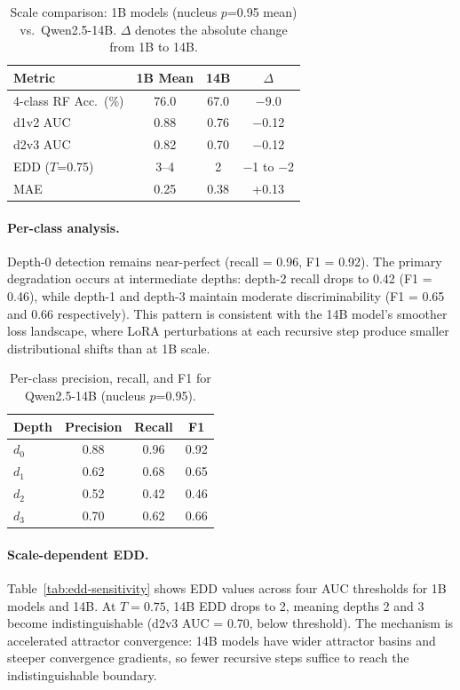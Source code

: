 \documentclass[11pt,a4paper]{article}
\begin{document}
\begin{table}[t]
\centering
\caption{Scale comparison: 1B models (nucleus $p$=0.95 mean) vs.\ Qwen2.5-14B. $\Delta$ denotes the absolute change from 1B to 14B.}
\label{tab:scale-comparison}
\begin{tabular}{lccc}
\toprule
\textbf{Metric} & \textbf{1B Mean} & \textbf{14B} & \textbf{$\Delta$} \\
\midrule
4-class RF Acc.\ (\%) & 76.0 & 67.0 & $-$9.0 \\
d1v2 AUC & 0.88 & 0.76 & $-$0.12 \\
d2v3 AUC & 0.82 & 0.70 & $-$0.12 \\
EDD ($T$=0.75) & 3--4 & 2 & $-$1 to $-$2 \\
MAE & 0.25 & 0.38 & +0.13 \\
\bottomrule
\end{tabular}
\end{table}

\paragraph{Per-class analysis.} Depth-0 detection remains near-perfect (recall = 0.96, F1 = 0.92). The primary degradation occurs at intermediate depths: depth-2 recall drops to 0.42 (F1 = 0.46), while depth-1 and depth-3 maintain moderate discriminability (F1 = 0.65 and 0.66 respectively). This pattern is consistent with the 14B model's smoother loss landscape, where LoRA perturbations at each recursive step produce smaller distributional shifts than at 1B scale.

\begin{table}[t]
\centering
\caption{Per-class precision, recall, and F1 for Qwen2.5-14B (nucleus $p$=0.95).}
\label{tab:14b-perclass}
\begin{tabular}{lccc}
\toprule
\textbf{Depth} & \textbf{Precision} & \textbf{Recall} & \textbf{F1} \\
\midrule
$d_0$ & 0.88 & 0.96 & 0.92 \\
$d_1$ & 0.62 & 0.68 & 0.65 \\
$d_2$ & 0.52 & 0.42 & 0.46 \\
$d_3$ & 0.70 & 0.62 & 0.66 \\
\bottomrule
\end{tabular}
\end{table}

\paragraph{Scale-dependent EDD.} Table~\ref{tab:edd-sensitivity} shows EDD values across four AUC thresholds for 1B models and 14B. At $T = 0.75$, 14B EDD drops to 2, meaning depths 2 and 3 become indistinguishable (d2v3 AUC = 0.70, below threshold). The mechanism is accelerated attractor convergence: 14B models have wider attractor basins and steeper convergence gradients, so fewer recursive steps suffice to reach the indistinguishable boundary.
\end{document}
